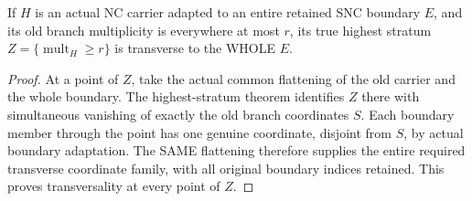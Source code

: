 \begin{theorem}
\label{hir:boundary-adapted-highest-stratum-transverse}
\leanok
If $H$ is an actual NC carrier adapted to an entire retained SNC boundary $E$,
and its old branch multiplicity is everywhere at most $r$, its true highest
stratum $Z=\{\operatorname{mult}_H\ge r\}$ is transverse to the WHOLE $E$.
\end{theorem}
\begin{proof}
At a point of $Z$, take the actual common flattening of the old carrier and
the whole boundary. The highest-stratum theorem identifies $Z$ there with
simultaneous vanishing of exactly the old branch coordinates $S$. Each
boundary member through the point has one genuine coordinate, disjoint from
$S$, by actual boundary adaptation. The SAME flattening therefore supplies
the entire required transverse coordinate family, with all original boundary
indices retained. This proves transversality at every point of $Z$.
\end{proof}

